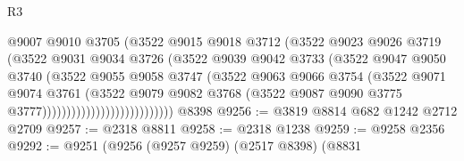 \begin{lexlean}{R3}
\begin{coremodule}
                                      @9007
                                      @9010
                                      @3705
                                      (@3522
                                        @9015
                                        @9018
                                        @3712
                                        (@3522
                                          @9023
                                          @9026
                                          @3719
                                          (@3522
                                            @9031
                                            @9034
                                            @3726
                                            (@3522
                                              @9039
                                              @9042
                                              @3733
                                              (@3522
                                                @9047
                                                @9050
                                                @3740
                                                (@3522
                                                  @9055
                                                  @9058
                                                  @3747
                                                  (@3522
                                                    @9063
                                                    @9066
                                                    @3754
                                                    (@3522
                                                      @9071
                                                      @9074
                                                      @3761
                                                      (@3522
                                                        @9079
                                                        @9082
                                                        @3768
                                                        (@3522
                                                          @9087
                                                          @9090
                                                          @3775
                                                          @3777)))))))))))))))))))))))))))
    @8398
@9256 := @3819 @8814 @682 @1242 @2712 @2709
@9257 := @2318 @8811
@9258 := @2318 @1238
@9259 := @9258 @2356
@9292 := @9251
    (@9256
      (@9257 @9259)
      (@2517 @8398)
      (@8831

\end{coremodule}
\end{lexlean}
